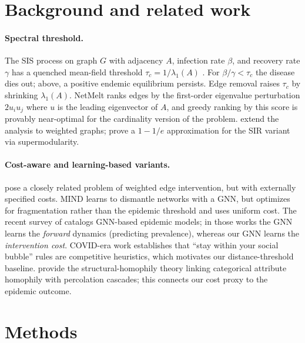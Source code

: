 \documentclass{article}
\begin{document}
\section{Background and related work}
\label{sec:related}

\paragraph{Spectral threshold.}
The SIS process on graph $G$ with adjacency $A$, infection rate
$\beta$, and recovery rate $\gamma$ has a quenched mean-field
threshold $\tau_c = 1/\lambda_1(A)$ \citep{wang2003threshold}. For
$\beta/\gamma < \tau_c$ the disease dies out; above, a positive
endemic equilibrium persists. Edge removal raises $\tau_c$ by
shrinking $\lambda_1(A)$. NetMelt \citep{tong2012netmelt} ranks edges
by the first-order eigenvalue perturbation $2 u_i u_j$ where $u$ is
the leading eigenvector of $A$, and greedy ranking by this score is
provably near-optimal for the cardinality version of the problem.
\citet{saha2015greedywalk} extend the analysis to weighted graphs;
\citet{yi2022supermodular} prove a $1 - 1/e$ approximation for the
SIR variant via supermodularity.

\paragraph{Cost-aware and learning-based variants.}
\citet{li2024frankwolfe} pose a closely related problem of weighted
edge intervention, but with externally specified costs. MIND
\citep{tian2025mind} learns to dismantle networks with a GNN, but
optimizes for fragmentation rather than the epidemic threshold and
uses uniform cost. The recent survey of
\citet{liu2024gnnepidemic} catalogs GNN-based epidemic models; in
those works the GNN learns the \emph{forward} dynamics (predicting
prevalence), whereas our GNN learns the \emph{intervention cost}.
COVID-era work \citep{block2020socialdistancing} establishes that
``stay within your social bubble'' rules are competitive heuristics,
which motivates our distance-threshold baseline.
\citet{rizi2025homophily} provide the structural-homophily theory
linking categorical attribute homophily with percolation cascades;
this connects our cost proxy to the epidemic outcome.

\section{Methods}
\label{sec:methods}
\end{document}
